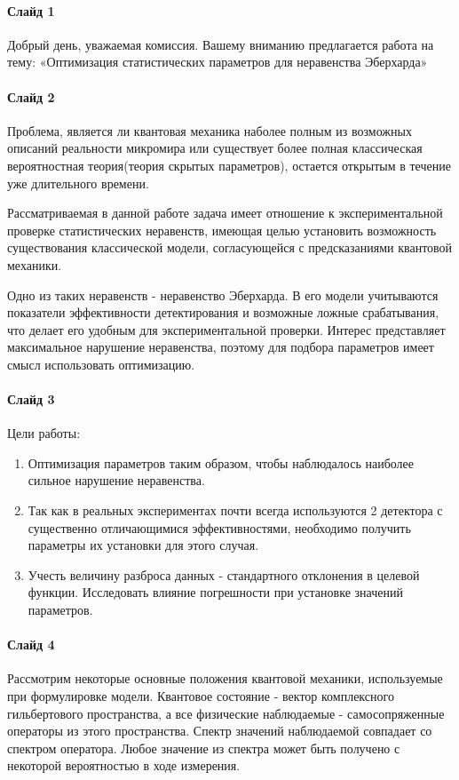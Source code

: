 \documentclass[11pt]{article}
\begin{document}
\paragraph{Слайд 1}
Добрый день, уважаемая комиссия. Вашему вниманию предлагается работа на тему: «Оптимизация статистических параметров для неравенства Эберхарда»
\paragraph{Слайд 2}
Проблема, является ли квантовая механика наболее полным из возможных описаний реальности микромира или существует более полная классическая вероятностная теория(теория скрытых параметров), остается открытым в течение уже длительного времени.

Рассматриваемая в данной работе задача имеет отношение к экспериментальной проверке статистических неравенств, имеющая целью установить возможность существования классической модели, согласующейся с предсказаниями квантовой механики.

Одно из таких неравенств - неравенство Эберхарда. В его модели учитываются показатели эффективности детектирования и возможные ложные срабатывания, что делает его удобным для экспериментальной проверки. Интерес представляет максимальное нарушение неравенства, поэтому для подбора параметров имеет смысл использовать оптимизацию.

\paragraph{Слайд 3}
Цели работы:
\begin{enumerate}
\item  Оптимизация параметров таким образом, чтобы наблюдалось наиболее сильное нарушение неравенства.
\item Так как в реальных экспериментах почти всегда используются 2 детектора с существенно отличающимися эффективностями, необходимо получить параметры их установки для этого случая.
\item Учесть величину разброса данных - стандартного отклонения в целевой функции. Исследовать влияние погрешности при установке значений параметров.
\end{enumerate}

\paragraph{Слайд 4}
Рассмотрим некоторые основные положения квантовой механики, используемые при формулировке модели. Квантовое состояние - вектор комплексного гильбертового пространства, а все физические наблюдаемые - самосопряженные операторы из этого пространства. Спектр значений наблюдаемой совпадает со спектром оператора. Любое значение из спектра может быть получено с некоторой вероятностью в ходе измерения.
\end{document}
